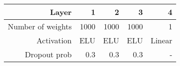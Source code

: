 \begin{tabular}{rrrrr}
    \hline
    \hline
    Layer & 1 & 2 & 3 & 4\\
    \hline
    Number of weights & 1000 & 1000 & 1000 & 1\\
    Activation & ELU & ELU & ELU & Linear\\
    Dropout prob & 0.3 & 0.3 & 0.3 & -\\
    \hline
\end{tabular}

